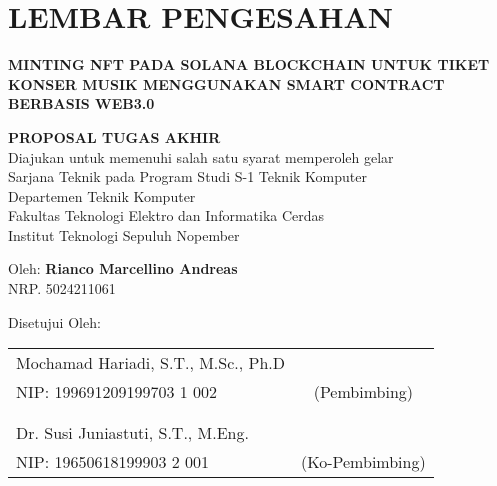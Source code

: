 \chapter*{LEMBAR PENGESAHAN}

\thispagestyle{empty}

\begin{center}
  \textbf{MINTING NFT PADA SOLANA BLOCKCHAIN UNTUK TIKET KONSER MUSIK MENGGUNAKAN SMART CONTRACT BERBASIS WEB3.0}
\end{center}

\vspace{1.5cm}

\begingroup
\small

\begin{center}
  \textbf{PROPOSAL TUGAS AKHIR} \\ 
  Diajukan untuk memenuhi salah satu syarat memperoleh gelar \\ 
  Sarjana Teknik pada Program Studi S-1 Teknik Komputer \\ 
  Departemen Teknik Komputer \\ 
  Fakultas Teknologi Elektro dan Informatika Cerdas \\ 
  Institut Teknologi Sepuluh Nopember
\end{center}

\vspace{1.5cm}

\begin{center}
  Oleh: \textbf{Rianco Marcellino Andreas} \\ 
  NRP. 5024211061
\end{center}

\vspace{1.5cm}

\begin{center}
  Disetujui Oleh:
\end{center}

\vspace{1.5cm}

\begingroup
\setlength{\tabcolsep}{0pt} %

\noindent
\begin{tabularx}{\textwidth}{X c}
  Mochamad Hariadi, S.T., M.Sc., Ph.D & \\ 
  NIP: 199691209199703 1 002          & (Pembimbing) \\ 
                                       &              \\ 
                                       &              \\ 
  Dr. Susi Juniastuti, S.T., M.Eng.   & \\ 
  NIP: 19650618199903 2 001           & (Ko-Pembimbing) \\ 
\end{tabularx}
\endgroup

